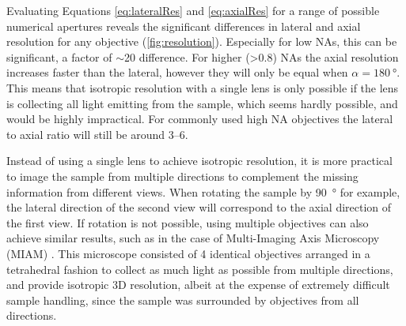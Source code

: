   Evaluating Equations \ref{eq:lateralRes} and \ref{eq:axialRes} for a range of possible numerical apertures reveals the significant differences in lateral and axial resolution for any objective (\autoref{fig:resolution}). Especially for low NAs, this can be significant, a factor of $\sim$20 difference. For higher (>0.8) NAs the axial resolution increases faster than the lateral, however they will only be equal when $\alpha=\SI{180}{\degree}$. This means that isotropic resolution with a single lens is only possible if the lens is collecting all light emitting from the sample, which seems hardly possible, and would be highly impractical. For commonly used high NA objectives the lateral to axial ratio will still be around 3--6. 

  Instead of using a single lens to achieve isotropic resolution, it is more practical to image the sample from multiple directions to complement the missing information from different views. When rotating the sample by \SI{90}{\degree} for example, the lateral direction of the second view will correspond to the axial direction of the first view. If rotation is not possible, using multiple objectives can also achieve similar results, such as in the case of Multi-Imaging Axis Microscopy (MIAM) \cite{swoger_multiple_2003,swoger_multi-view_2007}. This microscope consisted of 4 identical objectives arranged in a tetrahedral fashion to collect as much light as possible from multiple directions, and provide isotropic 3D resolution, albeit at the expense of extremely difficult sample handling, since the sample was surrounded by objectives from all directions. 






                                                              

